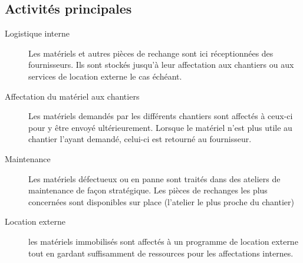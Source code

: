     \subsection{Activités principales}
        \begin{description}
            \item [Logistique interne]
            Les matériels et autres pièces de rechange sont ici réceptionnées des fournisseurs. Ils sont stockés jusqu'à leur affectation aux chantiers ou aux services de location externe le cas échéant.

            \item [Affectation du matériel aux chantiers]
            Les matériels demandés par les différents chantiers sont affectés à ceux-ci pour y être envoyé ultérieurement. Lorsque le matériel n’est plus utile au chantier l’ayant demandé, celui-ci est retourné au fournisseur.


            \item [Maintenance]
            Les matériels défectueux ou en panne sont traités dans des ateliers de maintenance de façon stratégique. Les pièces de rechanges les plus concernées sont disponibles sur place (l’atelier le plus proche du chantier)

            \item [Location externe]
            les matériels immobilisés sont affectés à un programme de location externe tout en gardant suffisamment de ressources pour les affectations internes.

        \end{description}

